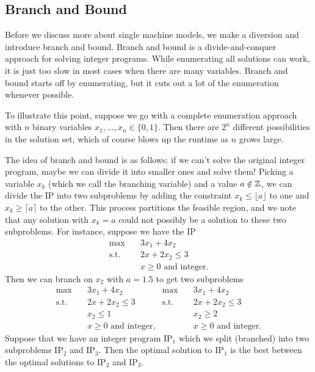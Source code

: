 \subsection{Branch and Bound}\label{subsec:2.2}
Before we discuss more about single machine models, we make a diversion 
and introduce branch and bound. 
Branch and bound is a divide-and-conquer approach for solving integer programs.
While enumerating all solutions can work, it is just too slow in most cases 
when there are many variables. Branch and bound starts off by enumerating, 
but it cuts out a lot of the enumeration whenever possible. 

To illustrate this point, suppose we go with a complete enumeration approach 
with $n$ binary variables $x_1, \dots, x_n \in \{0, 1\}$. Then there are 
$2^n$ different possibilities in the solution set, which of course blows 
up the runtime as $n$ grows large. 

The idea of branch and bound is as follows: if we can't solve the original 
integer program, maybe we can divide it into smaller ones and solve them! 
Picking a variable $x_k$ (which we call the branching variable) and a 
value $a \notin \mathbb{Z}$, we can divide the IP into two subproblems by 
adding the constraint $x_k \leq \lfloor a \rfloor$ to one and 
$x_k \geq \lceil a \rceil$ to the other. This process partitions the feasible 
region, and we note that any solution with $x_k = a$ could not possibly 
be a solution to these two subproblems. For instance, suppose we have the IP 
\begin{align*}
    \max\quad & 3x_1 + 4x_2 \\ 
    \text{s.t.}\quad & 2x + 2x_2 \leq 3 \\ 
    & x \geq 0 \text{ and integer.}
\end{align*}
Then we can branch on $x_2$ with $a = 1.5$ to get two subproblems 
\begin{align*}
    \max\quad & 3x_1 + 4x_2 & \max\quad & 3x_1 + 4x_2 \\ 
    \text{s.t.}\quad & 2x + 2x_2 \leq 3 & \text{s.t.}\quad & 2x + 2x_2 \leq 3 \\
    & x_2 \leq 1 & & x_2 \geq 2 \\  
    & x \geq 0 \text{ and integer,} & & x \geq 0 \text{ and integer.}
\end{align*}
Suppose that we have an integer program $\text{IP}_1$ which we split (branched) 
into two subproblems $\text{IP}_2$ and $\text{IP}_3$. Then the optimal solution to 
$\text{IP}_1$ is the best between the optimal solutions to $\text{IP}_2$ and 
$\text{IP}_3$. 

